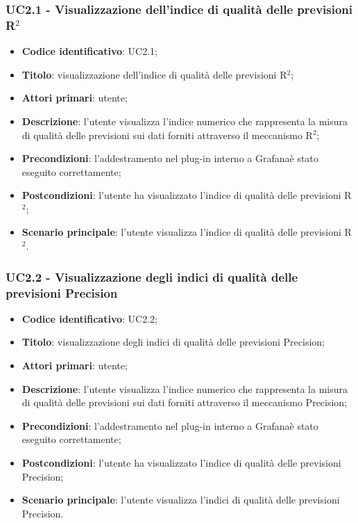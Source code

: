 \subsubsection{UC2.1 - Visualizzazione dell'indice di qualità delle previsioni R$^{2}$}
\begin{itemize}
	\item \textbf{Codice identificativo}: UC2.1;
	\item \textbf{Titolo}: visualizzazione dell'indice di qualità delle previsioni R$^{2}$\glo;
	\item \textbf{Attori primari}: utente;
	\item \textbf{Descrizione}: l'utente visualizza l'indice numerico che rappresenta la misura di qualità delle previsioni sui dati forniti attraverso il meccanismo R$^{2}$\glo;
	\item \textbf{Precondizioni}: l'addestramento nel plug-in interno a Grafana\glosp è stato eseguito correttamente;
	\item \textbf{Postcondizioni}: l'utente ha visualizzato l'indice di qualità delle previsioni R$^{2}$\glo;
	\item \textbf{Scenario principale}: l'utente visualizza l'indice di qualità delle previsioni R$^{2}$\glo.
\end{itemize} 
\subsubsection{UC2.2 - Visualizzazione degli indici di qualità delle previsioni Precision}
\begin{itemize}
	\item \textbf{Codice identificativo}: UC2.2;
	\item \textbf{Titolo}: visualizzazione degli indici di qualità delle previsioni Precision\glo;
	\item \textbf{Attori primari}: utente;
	\item \textbf{Descrizione}: l'utente visualizza l'indice numerico che rappresenta la misura di qualità delle previsioni sui dati forniti attraverso il meccanismo Precision\glo;
	\item \textbf{Precondizioni}: l'addestramento nel plug-in interno a Grafana\glosp è stato eseguito correttamente;
	\item \textbf{Postcondizioni}: l'utente ha visualizzato l'indice di qualità delle previsioni Precision\glo;
	\item \textbf{Scenario principale}: l'utente visualizza l'indici di qualità delle previsioni Precision\glo.
\end{itemize} 
